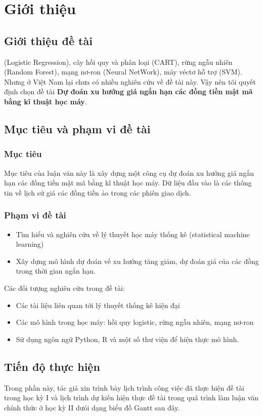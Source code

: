 \chapter{Giới thiệu} 
\section{Giới thiệu đề tài}
(Logistic Regression), cây hồi quy và phân loại (CART),
rừng ngẫu nhiên (Random Forest),
mạng nơ-ron (Neural NetWork),
máy véctơ hỗ trợ (SVM).
Nhưng ở Việt Nam lại chưa có nhiều nghiên cứu về đề tài này.
Vậy nên tôi quyết định chọn đề tài \textbf{Dự đoán xu hướng giá ngắn hạn các đồng tiền mật mã bằng kĩ thuật học máy}.
\section{Mục tiêu và phạm vi đề tài}
\subsection{Mục tiêu}
Mục tiêu của luận văn này là xây dựng một công cụ dự đoán xu hướng giá ngắn hạn
các đồng tiền mật mã bằng kĩ thuật học máy. Dữ liệu đầu vào là các thông tin về
lịch sử giá các  đồng tiền ảo trong các phiên giao dịch.
\subsection{Phạm vi đề tài}
\begin{itemize}
\item Tìm hiểu và nghiên cứu về lý thuyết học máy thống kê (statistical machine learning)
\item Xây dựng mô hình dự đoán vế xu hướng tăng giảm, dự đoán giá của các đồng trong thời gian ngắn hạn.
\end{itemize}
Các đối tượng nghiên cứu trong đề tài:
\begin{itemize}
\item Các tài liệu liên quan tới lý thuyết thống kê hiện đại
\item Các mô hình trong học máy: hồi quy logistic, rừng ngẫu nhiên, mạng nơ-ron
\item Sử dụng ngôn ngữ Python, R và một số thư viện để hiện thực mô hình.
\end{itemize}

\section{Tiến độ thực hiện}


Trong phần này, tác giả xin trình bày lịch trình công việc đã thực hiện đề tài trong học
kỳ I và lịch trình dự kiến hiện thực đề tài trong quá trình làm luận văn chính thức ở học
kỳ II dưói dạng biểu đồ Gantt sau đây.

